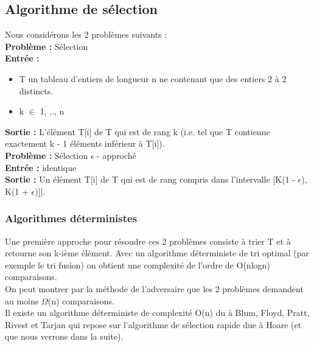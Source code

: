 \documentclass[12pt,a4paper]{article}
\begin{document}
\subsection{Algorithme de sélection}
Nous considérons les 2 problèmes suivants :\\
\textbf{Problème :} Sélection\\
\textbf{Entrée :}
\begin{itemize}
	\item T un tableau d'entiers de longueur n ne contenant que des entiers 2 à 2 distincts.
	\item k $\in$ {1, .., n}
\end{itemize}
\textbf{Sortie :} L'élément T[i] de T qui est de rang k (i.e. tel que T contienne exactement k - 1 éléments inférieur à T[i]).\\
\textbf{Problème :} Sélection $\epsilon$ - approché\\
\textbf{Entrée :} identique\\
\textbf{Sortie :} Un élément T[i] de T qui est de rang compris dans l'intervalle [K(1 - $\epsilon$), K(1 + $\epsilon$)]].
\subsubsection{Algorithmes déterministes}
Une première approche pour résoudre ces 2 problèmes consiste à trier T et à retourne son k-ième élément. Avec un algorithme déterministe de tri optimal (par exemple le tri fusion) on obtient une complexité de l'ordre de O(nlogn) comparaisons.\\
On peut montrer par la méthode de l'adversaire que les 2 problèmes demandent au moins $\Omega$(n) comparaisons.\\
Il existe un algorithme déterministe de complexité O(n) du à Blum, Floyd, Pratt, Rivest et Tarjan qui repose sur l'algorithme de sélection rapide due à Hoare (et que nous verrons dans la suite).
\end{document}
